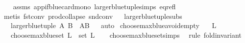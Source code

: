 \begin{isabellebody}
%
\isadelimproof
\ \ %
\endisadelimproof
%
\isatagproof
{}\isamarkupfalse%
\ assms\ app{\isacharunderscore}{\kern0pt}if{\isacharunderscore}{\kern0pt}blue{\isacharunderscore}{\kern0pt}card{\isacharunderscore}{\kern0pt}mono\ larger{\isacharunderscore}{\kern0pt}blue{\isacharunderscore}{\kern0pt}tuple{\isachardot}{\kern0pt}simps\ eq{\isacharunderscore}{\kern0pt}refl\isanewline
\ \ \isamarkupfalse%
\ {\isacharparenleft}{\kern0pt}metis\ fst{\isacharunderscore}{\kern0pt}conv\ prod{\isachardot}{\kern0pt}collapse\ snd{\isacharunderscore}{\kern0pt}conv{\isacharparenright}{\kern0pt}%
\endisatagproof
{\isafoldproof}%
%
\isadelimproof
\ \isanewline
%
\endisadelimproof
\isanewline
\isanewline
{}\isamarkupfalse%
\ larger{\isacharunderscore}{\kern0pt}blue{\isacharunderscore}{\kern0pt}tuple{\isacharunderscore}{\kern0pt}subs{\isacharcolon}{\kern0pt}\isanewline
\ \ \ {\isachardoublequoteopen}larger{\isacharunderscore}{\kern0pt}blue{\isacharunderscore}{\kern0pt}tuple\ A\ B\ {\isasymin}\ {\isacharbraceleft}{\kern0pt}A{\isacharcomma}{\kern0pt}B{\isacharbraceright}{\kern0pt}{\isachardoublequoteclose}%
\isadelimproof
\ %
\endisadelimproof
%
\isatagproof
{}\isamarkupfalse%
\ auto%
\endisatagproof
{\isafoldproof}%
%
\isadelimproof
%
\endisadelimproof
%
\isadelimdocument
%
\endisadelimdocument
%
\isatagdocument
%
\isamarkuptrue%
%
\endisatagdocument
{\isafolddocument}%
%
\isadelimdocument
%
\endisadelimdocument
{}\isamarkupfalse%
\ choose{\isacharunderscore}{\kern0pt}max{\isacharunderscore}{\kern0pt}blue{\isacharunderscore}{\kern0pt}avoid{\isacharunderscore}{\kern0pt}empty{\isacharcolon}{\kern0pt}\isanewline
\ \ \ {\isachardoublequoteopen}L\ {\isasymnoteq}\ {\isacharbrackleft}{\kern0pt}{\isacharbrackright}{\kern0pt}{\isachardoublequoteclose}\isanewline
\ \ \ {\isachardoublequoteopen}choose{\isacharunderscore}{\kern0pt}max{\isacharunderscore}{\kern0pt}blue{\isacharunderscore}{\kern0pt}set\ L\ {\isasymin}\ set\ L{\isachardoublequoteclose}\isanewline
%
\isadelimproof
\ \ %
\endisadelimproof
%
\isatagproof
{}\isamarkupfalse%
\ choose{\isacharunderscore}{\kern0pt}max{\isacharunderscore}{\kern0pt}blue{\isacharunderscore}{\kern0pt}set{\isachardot}{\kern0pt}simps\ \isanewline
{}\isamarkupfalse%
\ {\isacharparenleft}{\kern0pt}rule\ fold{\isacharunderscore}{\kern0pt}invariant{\isacharparenright}{\kern0pt}\isanewline
\ \ \isamarkupfalse%

\end{isabellebody}
